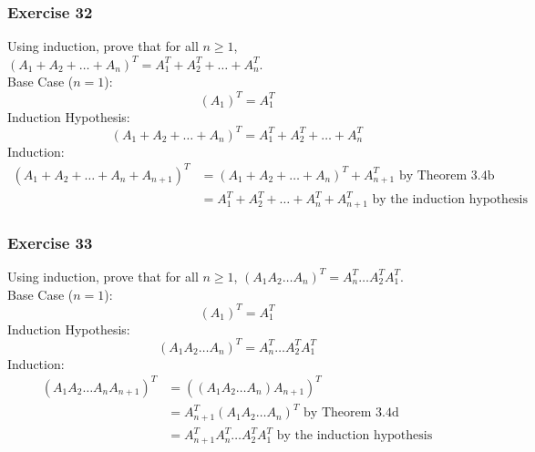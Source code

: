 \documentclass[letterpaper, 12pt]{math}
\begin{document}
\subsubsection*{Exercise 32}
Using induction, prove that for all \( n\ge1 \), \( (A_1+A_2+\dots+A_n)^T =
A_1^T+A_2^T+\dots+A_n^T \). \\
Base Case (\( n = 1 \)):
\[ (A_1)^T = A_1^T \]
Induction Hypothesis:
\[ (A_1+A_2+\dots+A_n)^T = A_1^T+A_2^T+\dots+A_n^T \]
Induction:
\begin{align*}
  (A_1+A_2+\dots+A_n+A_{n+1})^T &= (A_1+A_2+\dots+A_n)^T+A_{n+1}^T
    \text{ by Theorem 3.4b} \\
  &= A_1^T+A_2^T+\dots+A_n^T+A_{n+1}^T \text{ by the induction hypothesis}
\end{align*}

\subsubsection*{Exercise 33}
Using induction, prove that for all \( n\ge1 \), \( (A_1A_2\dots A_n)^T =
A_n^T\dots A_2^TA_1^T \). \\
Base Case (\( n = 1 \)):
\[ (A_1)^T = A_1^T \]
Induction Hypothesis:
\[ (A_1A_2\dots A_n)^T = A_n^T\dots A_2^TA_1^T \]
Induction:
\begin{align*}
  (A_1A_2\dots A_nA_{n+1})^T &= ((A_1A_2\dots A_n)A_{n+1})^T \\
  &= A_{n+1}^T(A_1A_2\dots A_n)^T \text{ by Theorem 3.4d} \\
  &= A_{n+1}^TA_n^T\dots A_2^TA_1^T \text{ by the induction hypothesis}
\end{align*}
\end{document}
